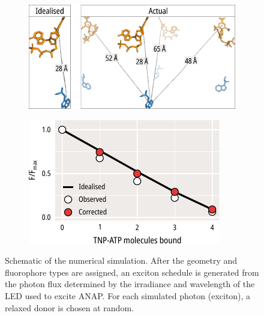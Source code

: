 \begin{figure}[hbtp]
\begin{minipage}{0.35\textwidth}
\begin{subfigure}[t]{\textwidth}
	\end{subfigure}
	\end{minipage}
	\hfill
	\begin{minipage}{0.55\textwidth}
	\begin{subfigure}[t]{\textwidth}
		\caption{}\label{ch3fig:exifret_coords}
		\centering
		\includegraphics[width=\textwidth]{exifret_coords.pdf}
	\end{subfigure}
	\vfill
	\begin{subfigure}[t]{\textwidth}
		\caption{}\label{ch3fig:exifret_out}
		\centering
		\includegraphics[width=\textwidth]{exifret_out.pdf}
	\end{subfigure}
	\end{minipage}
	\caption[Numerical analysis of FRET efficiency in tetrameric Kir6.2]{
	 Schematic of the numerical simulation.
	After the geometry and fluorophore types are assigned, an exciton schedule is generated from the photon flux determined by the irradiance and wavelength of the LED used to excite ANAP.
	For each simulated photon (exciton), a relaxed donor is chosen at random.
}
\end{figure}
